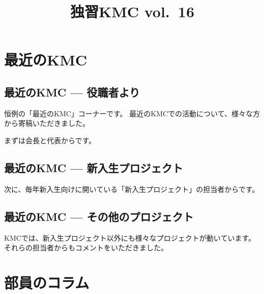 \documentclass[lualatex,b5paper,openany,pandoc,jbase=12Q,magstyle=nomag*]{luakmcbook}
\title{独習KMC vol.~16}
\date{}
\begin{document}


\maketitle



\tableofcontents

\part{最近のKMC}
\chapter{最近のKMC --- 役職者より}
恒例の「最近のKMC」コーナーです。
最近のKMCでの活動について、様々な方から寄稿いただきました。

まずは会長と代表からです。




\chapter{最近のKMC --- 新入生プロジェクト}
次に、毎年新入生向けに開いている「新入生プロジェクト」の担当者からです。







\chapter{最近のKMC --- その他のプロジェクト}
KMCでは、新入生プロジェクト以外にも様々なプロジェクトが動いています。それらの担当者からもコメントをいただきました。






\part{部員のコラム}





\end{document}
